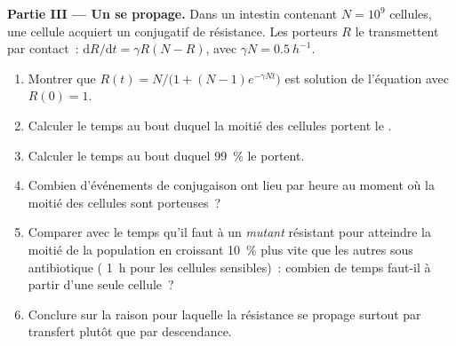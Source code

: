 \begin{problem}
\medskip
\noindent\textbf{Partie III --- Un  se propage.}
Dans un intestin contenant $N = 10^{9}$ cellules, une cellule acquiert
un  conjugatif de résistance. Les porteurs $R$ le transmettent
par contact~:
$\mathrm{d}R/\mathrm{d}t = \gamma R(N - R)$, avec $\gamma N =
\qty{0.5}{h^{-1}}$.
\begin{enumerate}[resume]
  \item Montrer que $R(t) = N/\bigl(1 + (N - 1)e^{-\gamma N t}\bigr)$
        est solution de l'équation avec $R(0) = 1$.
  \item Calculer le temps au bout duquel la moitié des cellules portent
        le .
  \item Calculer le temps au bout duquel \qty{99}{\%} le portent.
  \item Combien d'événements de conjugaison ont lieu par heure au moment
        où la moitié des cellules sont porteuses~?
  \item Comparer avec le temps qu'il faut à un \emph{mutant} résistant
        pour atteindre la moitié de la population en croissant
        \qty{10}{\%} plus vite que les autres sous antibiotique ( \qty{1}{h} pour les cellules sensibles)~: combien de
        temps faut-il à partir d'une seule cellule~?
  \item Conclure sur la raison pour laquelle la résistance se propage
        surtout par transfert plutôt que par descendance.
\end{enumerate}


\end{problem}
